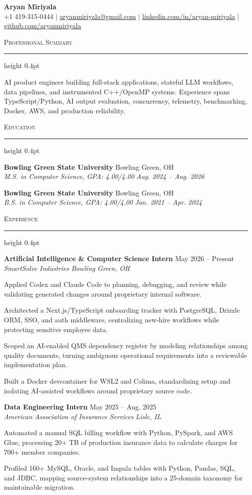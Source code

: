 \documentclass[letterpaper,11pt]{article}
\newcommand{\resumesection}[1]{%
  \par\vspace{2pt}%
  {\large\scshape #1}\par\vspace{2pt}%
  \hrule height 0.4pt\vspace{2pt}%
}
\newcommand{\resumeSubheading}[4]{
  \textbf{#1} \hfill #2\\
  \textit{#3} \hfill \textit{#4}
}
\begin{document}
\begin{center}
  {\LARGE \textbf{Aryan Miriyala}}\\[-1pt]
  \small
  +1 419-315-0444 $|$
  \href{mailto:aryanmiriyala@gmail.com}{aryanmiriyala@gmail.com} $|$
  \href{https://www.linkedin.com/in/aryan-miriyala-7788a21b6/}{linkedin.com/in/aryan-miriyala} $|$
  \href{https://github.com/aryanmiriyala}{github.com/aryanmiriyala}
\end{center}\vspace{-10pt}

\resumesection{Professional Summary}
AI product engineer building full-stack applications, stateful LLM workflows, data pipelines, and instrumented C++/OpenMP systems. Experience spans TypeScript/Python, AI output evaluation, concurrency, telemetry, benchmarking, Docker, AWS, and production reliability.

\resumesection{Education}
\resumeSubheading
{Bowling Green State University}{Bowling Green, OH}
{M.S. in Computer Science, GPA: 4.00/4.00}{Aug. 2024 -- Aug. 2026}

\resumeSubheading
{Bowling Green State University}{Bowling Green, OH}
{B.S. in Computer Science, GPA: 4.00/4.00}{Jan. 2021 -- Apr. 2024}

\resumesection{Experience}
\resumeSubheading
{Artificial Intelligence \& Computer Science Intern}{May 2026 -- Present}
{SmartSolve Industries}{Bowling Green, OH}
\begin{tightitemize}
  \item Applied Codex and Claude Code to planning, debugging, and review while validating generated changes around proprietary internal software.
  \item Architected a Next.js/TypeScript onboarding tracker with PostgreSQL, Drizzle ORM, SSO, and auth middleware, centralizing new-hire workflows while protecting sensitive employee data.
  \item Scoped an AI-enabled QMS dependency register by modeling relationships among quality documents, turning ambiguous operational requirements into a reviewable implementation plan.
  \item Built a Docker devcontainer for WSL2 and Colima, standardizing setup and isolating AI-assisted workflows around proprietary source code.
\end{tightitemize}

\resumeSubheading
{Data Engineering Intern}{May 2025 -- Aug. 2025}
{American Association of Insurance Services}{Lisle, IL}
\begin{tightitemize}
  \item Automated a manual SQL billing workflow with Python, PySpark, and AWS Glue, processing 20+ TB of production insurance data to calculate charges for 700+ member companies.
  \item Profiled 160+ MySQL, Oracle, and Impala tables with Python, Pandas, SQL, and JDBC, mapping source-system relationships into a 25-domain taxonomy for maintainable migration.
\end{tightitemize}
\end{document}
